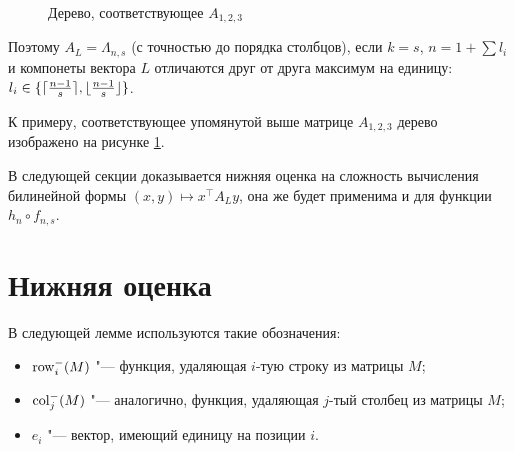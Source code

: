 \documentclass[a4paper, 14pt]{extarticle}
\begin{document}
\begin{figure}[h]
\centering
{}
\caption{Дерево, соответствующее $A_{1, 2, 3}$}
\label{fig_last_tree}
\end{figure}

Поэтому $A_L = \Lambda_{n, s}$ (с точностью до порядка столбцов), если $k = s$,
$n = 1 + \sum l_i$ и компонеты вектора $L$ отличаются друг от друга максимум на
единицу: $l_i \in \{\lceil\frac {n-1} s\rceil, \lfloor\frac {n-1} s\rfloor\}$.

К примеру, соответствующее упомянутой выше матрице $A_{1,2,3}$ дерево изображено
на рисунке \ref{fig_last_tree}.

В следующей секции доказывается нижняя оценка на сложность вычисления билинейной
формы $(x, y) \mapsto x^\top A_L y$, она же будет применима и для функции $h_n
\circ f_{n, s}$.

\section{Нижняя оценка}
\label{sec_bound}

В следующей лемме используются такие обозначения:
\begin{itemize}
\item $\operatorname{row}^-_i(M)$ "--- функция, удаляющая $i$-тую строку из матрицы $M$;
\item $\operatorname{col}^-_j(M)$ "--- аналогично, функция, удаляющая $j$-тый столбец из матрицы $M$;
\item $e_i$ "--- вектор, имеющий единицу на позиции $i$.
\end{itemize}
\end{document}
